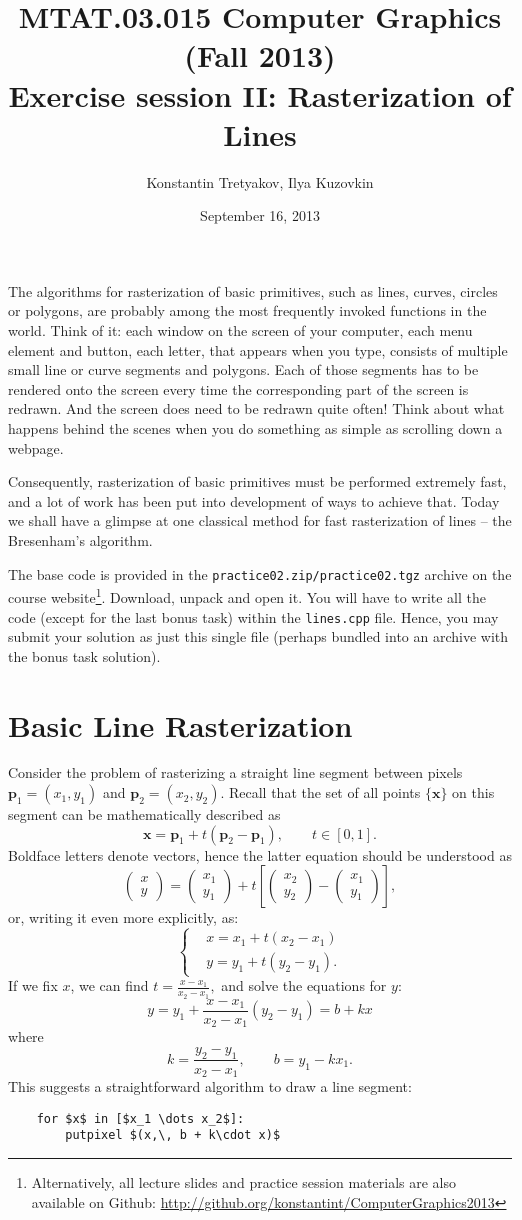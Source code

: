 \documentclass{article}
\newcommand{\bx}{\mathbf{x}}
\newcommand{\bp}{\mathbf{p}}
\newcommand{\pt}[2]{\left(\begin{array}{c}#1\\#2\end{array}\right)}
\begin{document}
\title{MTAT.03.015 Computer Graphics (Fall 2013)\\
Exercise session II: Rasterization of Lines}
\author{Konstantin Tretyakov, Ilya Kuzovkin}
\date{September 16, 2013}
\maketitle

The algorithms for rasterization of basic primitives, such as lines, curves, circles or polygons, are probably among the most frequently invoked functions in the world. Think of it: each window on the screen of your computer, each menu element and button, each letter, that appears when you type, consists of multiple small line or curve segments and polygons. Each of those segments has to be rendered onto the screen every time the corresponding part of the screen is redrawn. And the screen does need to be redrawn quite often! Think about what happens behind the scenes when you do something as simple as scrolling down a webpage.

Consequently, rasterization of basic primitives must be performed extremely fast, and a lot of work has been put into development of ways to achieve that. Today we shall have a glimpse at one classical method for fast rasterization of lines -- the Bresenham's algorithm.

The base code is provided in the \texttt{practice02.zip/practice02.tgz} archive on the course website\footnote{Alternatively, all lecture slides and practice session materials are also available on Github: \url{http://github.org/konstantint/ComputerGraphics2013}}. Download, unpack and open it. You will have to write all the code (except for the last bonus task) within the \texttt{lines.cpp} file. Hence, you may submit your solution as just this single file (perhaps bundled into an archive with the bonus task solution).

\section{Basic Line Rasterization}
Consider the problem of rasterizing a straight line segment between pixels $\bp_1 = (x_1, y_1)$ and $\bp_2 = (x_2, y_2)$. Recall that the set of all points $\{\bx\}$ on this segment can be mathematically described as
$$
\bx = \bp_1 + t(\bp_2 - \bp_1),\qquad t \in [0, 1].
$$
Boldface letters denote vectors, hence the latter equation should be understood as
$$
\pt{x}{y} = \pt{x_1}{y_1} + t\left[\pt{x_2}{y_2}-\pt{x_1}{y_1}\right],
$$
or, writing it even more explicitly, as:
$$
\begin{cases}
&x = x_1 + t(x_2 - x_1) \\
&y = y_1 + t(y_2 - y_1).
\end{cases}
$$
If we fix $x$, we can find 
$t = \frac{x - x_1}{x_2 - x_1},$
and solve the equations for $y$:
$$
y = y_1 + \frac{x - x_1}{x_2 - x_1}(y_2 - y_1) = b + kx
$$
where
$$
k = \frac{y_2 - y_1}{x_2 - x_1},\qquad b = y_1 - kx_1.
$$
This suggests a straightforward algorithm to draw a line segment: 
\begin{lstlisting}
	for $x$ in [$x_1 \dots x_2$]:
		putpixel $(x,\, b + k\cdot x)$
\end{lstlisting}
\end{document}
